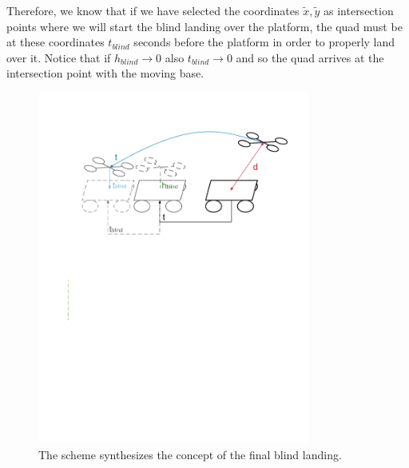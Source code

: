 Therefore, we know that if we have selected the coordinates $\tilde{x},\tilde{y}$ as intersection points where we will start the blind landing over the platform, the quad must be at these coordinates $t_{blind}$ seconds before the platform in order to properly land over it. Notice that if $h_{blind} \rightarrow 0$ also $t_{blind} \rightarrow 0$ and so the quad arrives at the intersection point with the moving base.\\

\begin{figure}[!htbp]
    \centering
    \includegraphics[width=0.8\textwidth]{img/blind_landing.pdf}
    \caption{The scheme synthesizes the concept of the final blind landing. }
    \label{fig:align_platform}
\end{figure}

